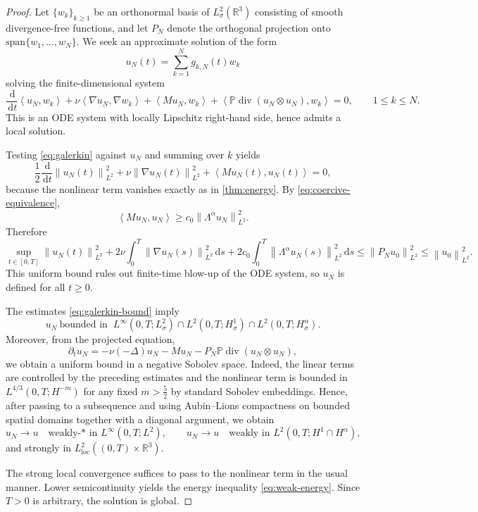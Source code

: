 \documentclass[11pt]{article}
\theoremstyle{definition}
\theoremstyle{remark}
\newcommand{\R}{\mathbb{R}}
\newcommand{\Pcal}{\mathbb{P}}
\newcommand{\dd}{\,\mathrm{d}}
\newcommand{\ip}[2]{\left\langle #1,#2\right\rangle}
\newcommand{\norm}[1]{\left\lVert #1\right\rVert}
\newcommand{\diver}{\operatorname{div}}
\begin{document}
\begin{proof}
Let $\{w_k\}_{k\ge1}$ be an orthonormal basis of $L^2_\sigma(\R^3)$ consisting of smooth divergence-free functions, and let $P_N$ denote the orthogonal projection onto $\mathrm{span}\{w_1,\dots,w_N\}$. We seek an approximate solution of the form
\[
u_N(t)=\sum_{k=1}^N g_{k,N}(t) w_k
\]
solving the finite-dimensional system
\begin{equation}\label{eq:galerkin}
\frac{\dd}{\dd t}\ip{u_N}{w_k}
+
\nu \ip{\nabla u_N}{\nabla w_k}
+
\ip{M u_N}{w_k}
+
\ip{\Pcal\diver(u_N\otimes u_N)}{w_k}
=
0,
\qquad 1\le k\le N.
\end{equation}
This is an ODE system with locally Lipschitz right-hand side, hence admits a local solution.

Testing \eqref{eq:galerkin} against $u_N$ and summing over $k$ yields
\[
\frac12\frac{\dd}{\dd t}\norm{u_N(t)}_{L^2}^2
+
\nu \norm{\nabla u_N(t)}_{L^2}^2
+
\ip{M u_N(t)}{u_N(t)}
=0,
\]
because the nonlinear term vanishes exactly as in \cref{thm:energy}. By \cref{eq:coercive-equivalence},
\[
\ip{M u_N}{u_N}\ge c_0 \norm{\Lambda^\alpha u_N}_{L^2}^2.
\]
Therefore
\begin{equation}\label{eq:galerkin-bound}
\sup_{t\in[0,T]}\norm{u_N(t)}_{L^2}^2
+
2\nu \int_0^T \norm{\nabla u_N(s)}_{L^2}^2 \dd s
+
2c_0 \int_0^T \norm{\Lambda^\alpha u_N(s)}_{L^2}^2 \dd s
\le
\norm{P_N u_0}_{L^2}^2
\le
\norm{u_0}_{L^2}^2.
\end{equation}
This uniform bound rules out finite-time blow-up of the ODE system, so $u_N$ is defined for all $t\ge0$.

The estimates \eqref{eq:galerkin-bound} imply
\[
u_N \ \text{bounded in }\ L^\infty(0,T;L^2_\sigma)\cap L^2(0,T;H^1_\sigma)\cap L^2(0,T;H^\alpha_\sigma).
\]
Moreover, from the projected equation,
\[
\partial_t u_N
=
-\nu (-\Delta)u_N - M u_N - P_N \Pcal\diver(u_N\otimes u_N),
\]
we obtain a uniform bound in a negative Sobolev space. Indeed, the linear terms are controlled by the preceding estimates and the nonlinear term is bounded in $L^{4/3}(0,T;H^{-m})$ for any fixed $m>\frac52$ by standard Sobolev embeddings. Hence, after passing to a subsequence and using Aubin--Lions compactness on bounded spatial domains together with a diagonal argument, we obtain
\[
u_N \to u
\quad \text{weakly-* in }L^\infty(0,T;L^2),
\qquad
u_N \to u
\quad \text{weakly in }L^2(0,T;H^1\cap H^\alpha),
\]
and strongly in $L^2_{\mathrm{loc}}((0,T)\times\R^3)$.

The strong local convergence suffices to pass to the nonlinear term in the usual manner. Lower semicontinuity yields the energy inequality \eqref{eq:weak-energy}. Since $T>0$ is arbitrary, the solution is global.
\end{proof}
\end{document}
